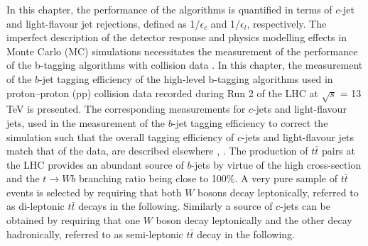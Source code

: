 \documentclass[letterpaper,12pt]{article}
\begin{document}
In this chapter, the performance of the algorithms is quantified 
in terms of $c$-jet and light-flavour jet rejections, defined as 
1/$\epsilon_c$ and 1/$\epsilon_l$, respectively. The imperfect 
description of the detector response and physics modelling effects 
in Monte Carlo (MC) simulations necessitates the measurement of the 
performance of the b-tagging algorithms with collision data 
\cite{PERF-2012-04,ATLAS-CONF-2018-045}. 
In this chapter, the measurement of the $b$-jet tagging efficiency 
of the high-level b-tagging algorithms used in proton–proton (pp) 
collision data recorded during Run 2 of the LHC at $\sqrt{s}$ = 13 TeV 
is presented. The corresponding measurements for $c$-jets and light-flavour 
jets, used in the measurement of the $b$-jet tagging efficiency to correct 
the simulation such that the overall tagging efficiency of $c$-jets and 
light-flavour jets match that of the data, are described elsewhere 
\cite{ATLAS-CONF-2018-006}, \cite{cjet}. The production of $t\bar{t}$ 
pairs at the LHC provides an abundant source of $b$-jets by virtue 
of the high cross-section and the $t \rightarrow Wb$ branching ratio 
being close to 100\%. A very pure sample of $t\bar{t}$ events is 
selected by requiring that both $W$ bosons decay leptonically, 
referred to as di-leptonic $t\bar{t}$ decays in the following. 
Similarly a source of $c$-jets can be obtained by requiring that 
one $W$ boson decay leptonically and the other decay hadronically, 
referred to as semi-leptonic $t\bar{t}$ decay in the following. 


\end{document}
